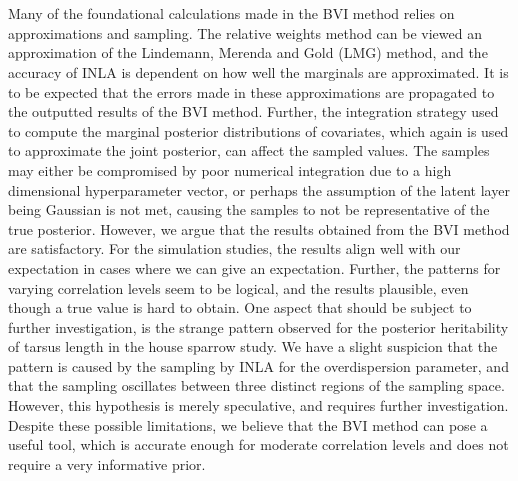 \\
\\
Many of the foundational calculations made in the BVI method relies on approximations and sampling. The relative weights method can be viewed an approximation of the Lindemann, Merenda and Gold (LMG) method, and the accuracy of INLA is dependent on how well the marginals are approximated. It is to be expected that the errors made in these approximations are propagated to the outputted results of the BVI method. Further, the integration strategy used to compute the marginal posterior distributions of covariates, which again is used to approximate the joint posterior, can affect the sampled values. The samples may either be compromised by poor numerical integration due to a high dimensional hyperparameter vector, or perhaps the assumption of the latent layer being Gaussian is not met, causing the samples to not be representative of the true posterior. However, we argue that the results obtained from the BVI method are satisfactory. For the simulation studies, the results align well with our expectation in cases where we can give an expectation. Further, the patterns for varying correlation levels seem to be logical, and the results plausible, even though a true value is hard to obtain. One aspect that should be subject to further investigation, is the strange pattern observed for the posterior heritability of tarsus length in the house sparrow study. We have a slight suspicion that the pattern is caused by the sampling by INLA for the overdispersion parameter, and that the sampling oscillates between three distinct regions of the sampling space. However, this hypothesis is merely speculative, and requires further investigation. Despite these possible limitations, we believe that the BVI method can pose a useful tool, which is accurate enough for moderate correlation levels and does not require a very informative prior.
